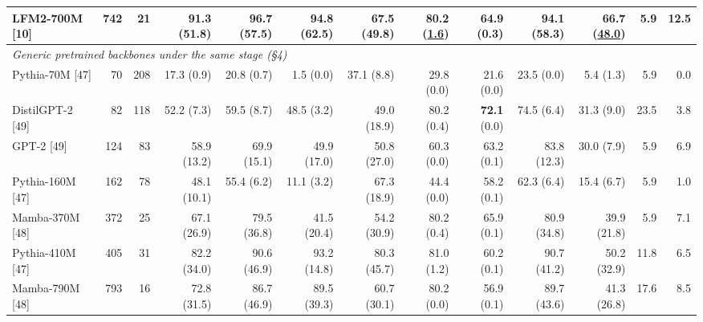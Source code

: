 \documentclass{article}
\begin{document}
\begin{table}[htbp]
{\begin{tabular}{lrr|rrr|rrrrrrr}
LFM2-700M [10] & 742 & 21 & 91.3 {\scriptsize (51.8)} & 96.7 {\scriptsize (57.5)} & 94.8 {\scriptsize (62.5)} & 67.5 {\scriptsize (49.8)} & 80.2 {\scriptsize (\underline{1.6})} & 64.9 {\scriptsize (0.3)} & 94.1 {\scriptsize (58.3)} & \textbf{66.7} {\scriptsize (\underline{48.0})} & 5.9 & 12.5 \\
\midrule
\multicolumn{13}{l}{\emph{Generic pretrained backbones under the same stage (\S4)}} \\
\midrule
Pythia-70M [47] & 70 & 208 & 17.3 {\scriptsize (0.9)} & 20.8 {\scriptsize (0.7)} & 1.5 {\scriptsize (0.0)} & 37.1 {\scriptsize (8.8)} & 29.8 {\scriptsize (0.0)} & 21.6 {\scriptsize (0.0)} & 23.5 {\scriptsize (0.0)} & 5.4 {\scriptsize (1.3)} & 5.9 & 0.0 \\
DistilGPT-2 [49] & 82 & 118 & 52.2 {\scriptsize (7.3)} & 59.5 {\scriptsize (8.7)} & 48.5 {\scriptsize (3.2)} & 49.0 {\scriptsize (18.9)} & 80.2 {\scriptsize (0.4)} & \textbf{72.1} {\scriptsize (0.0)} & 74.5 {\scriptsize (6.4)} & 31.3 {\scriptsize (9.0)} & 23.5 & 3.8 \\
GPT-2 [49] & 124 & 83 & 58.9 {\scriptsize (13.2)} & 69.9 {\scriptsize (15.1)} & 49.9 {\scriptsize (17.0)} & 50.8 {\scriptsize (27.0)} & 60.3 {\scriptsize (0.0)} & 63.2 {\scriptsize (0.1)} & 83.8 {\scriptsize (12.3)} & 30.0 {\scriptsize (7.9)} & 5.9 & 6.9 \\
Pythia-160M [47] & 162 & 78 & 48.1 {\scriptsize (10.1)} & 55.4 {\scriptsize (6.2)} & 11.1 {\scriptsize (3.2)} & 67.3 {\scriptsize (18.9)} & 44.4 {\scriptsize (0.0)} & 58.2 {\scriptsize (0.1)} & 62.3 {\scriptsize (6.4)} & 15.4 {\scriptsize (6.7)} & 5.9 & 1.0 \\
Mamba-370M [48] & 372 & 25 & 67.1 {\scriptsize (26.9)} & 79.5 {\scriptsize (36.8)} & 41.5 {\scriptsize (20.4)} & 54.2 {\scriptsize (30.9)} & 80.2 {\scriptsize (0.4)} & 65.9 {\scriptsize (0.1)} & 80.9 {\scriptsize (34.8)} & 39.9 {\scriptsize (21.8)} & 5.9 & 7.1 \\
Pythia-410M [47] & 405 & 31 & 82.2 {\scriptsize (34.0)} & 90.6 {\scriptsize (46.9)} & 93.2 {\scriptsize (14.8)} & 80.3 {\scriptsize (45.7)} & 81.0 {\scriptsize (1.2)} & 60.2 {\scriptsize (0.1)} & 90.7 {\scriptsize (41.2)} & 50.2 {\scriptsize (32.9)} & 11.8 & 6.5 \\
Mamba-790M [48] & 793 & 16 & 72.8 {\scriptsize (31.5)} & 86.7 {\scriptsize (46.9)} & 89.5 {\scriptsize (39.3)} & 60.7 {\scriptsize (30.1)} & 80.2 {\scriptsize (0.0)} & 56.9 {\scriptsize (0.1)} & 89.7 {\scriptsize (43.6)} & 41.3 {\scriptsize (26.8)} & 17.6 & 8.5 \\

\end{tabular}}
\end{table}
\end{document}
